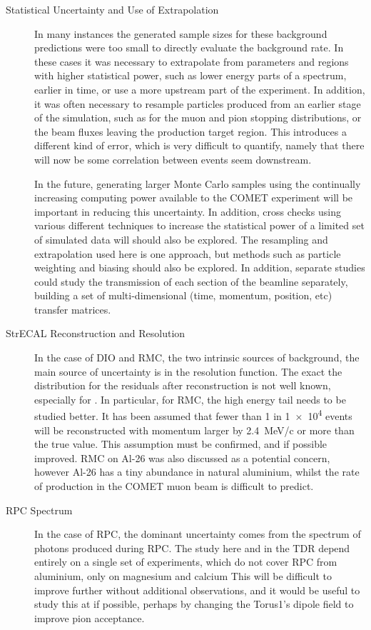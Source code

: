 \begin{description}
\item[Statistical Uncertainty and Use of Extrapolation]
In many instances the generated sample sizes for these background predictions were too small to directly evaluate the background rate.
In these cases it was necessary to extrapolate from parameters and regions with higher statistical power, such as lower energy parts of a spectrum, earlier in time, or use a more upstream part of the experiment.
In addition, it was often necessary to resample particles produced from an earlier stage of the simulation, such as for the muon and pion stopping distributions, or the beam fluxes leaving the production target region.
This introduces a different kind of error, which is very difficult to quantify, namely that there will now be some correlation between events seem downstream.

In the future, generating larger Monte Carlo samples using the continually increasing computing power available to the COMET experiment will be important in reducing this uncertainty.
In addition, cross checks using various different techniques to increase the statistical power of a limited set of simulated data will should also be explored.
The resampling and extrapolation used here is one approach, but methods such as particle weighting and biasing should also be explored.
In addition, separate studies could study the transmission of each section of the beamline separately, building a set of multi-dimensional (time, momentum, position, etc) transfer matrices.

\item[StrECAL Reconstruction and Resolution]
In the case of \ac{DIO} and \ac{RMC}, the two intrinsic sources of background, the main source of uncertainty is in the resolution function.
The exact the distribution for the residuals after reconstruction is not well known, especially for \phaseII.
In particular, for \ac{RMC}, the high energy tail needs to be studied better. 
It has been assumed that fewer than 1 in \num{1e4} events will be reconstructed with momentum larger by 2.4~MeV/c or more than the true value.
This assumption must be confirmed, and if possible improved.
RMC on Al-26 was also discussed as a potential concern, however Al-26 has a tiny abundance in natural aluminium, whilst the rate of production in the COMET muon beam is difficult to predict.

\item[RPC Spectrum]
In the case of \acf{RPC}, the dominant uncertainty comes from the spectrum of photons produced during RPC.
The study here and in the \phaseI TDR depend entirely on a single set of experiments, which do not cover RPC from aluminium, only on magnesium and calcium
This will be difficult to improve further without additional observations, and it would be useful to study this at \phaseI if possible, perhaps by changing the Torus1's dipole field to improve pion acceptance.


\end{description}
